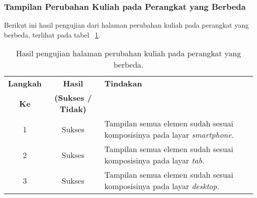 \subsubsection{Tampilan Perubahan Kuliah pada Perangkat yang Berbeda}
Berikut ini hasil pengujian dari halaman perubahan kuliah pada perangkat yang berbeda, terlihat pada tabel ~\ref{hasil:PerubahanKuliahDevices}.
\begin{table}[H]
	\centering 
	\caption{Hasil pengujian halaman perubahan kuliah pada perangkat yang berbeda.}
	\label{hasil:PerubahanKuliahDevices}
	\begin{tabular}{|c|c|p{}|}
		\toprule
		\textbf{Langkah} & \textbf{Hasil} & \textbf{Tindakan}\\
		\textbf{Ke} & \textbf{(Sukses / Tidak)} & \\		
		\midrule
		1 & Sukses & Tampilan semua elemen sudah sesuai komposisinya pada layar \textit{smartphone}.\\
		\hline
		2 & Sukses & Tampilan semua elemen sudah sesuai komposisinya pada layar \textit{tab}.\\
		\hline
		3 & Sukses & Tampilan semua elemen sudah sesuai komposisinya pada layar \textit{desktop}.\\
		\hline
		\bottomrule		
	\end{tabular} 
\end{table}

